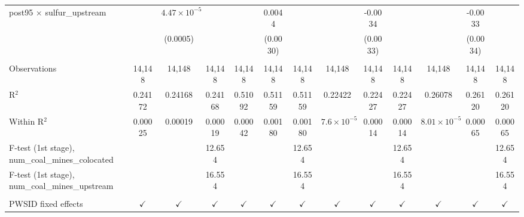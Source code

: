 \begin{table}[htbp]
\begin{adjustbox}{width = \textwidth, center}
\begin{tabular}{lcccccccccccc}
         post95 $\times$ sulfur\_upstream                   &                       & $4.47\times 10^{-5}$  &               &               & 0.0044          &               &                      & -0.0034       &               &                       & -0.0033       &   \\   
                                                            &                       & (0.0005)              &               &               & (0.0030)        &               &                      & (0.0033)      &               &                       & (0.0034)      &   \\   
          \\
         Observations                                       & 14,148                & 14,148                & 14,148        & 14,148        & 14,148          & 14,148        & 14,148               & 14,148        & 14,148        & 14,148                & 14,148        & 14,148\\  
         R$^2$                                              & 0.24172               & 0.24168               & 0.24168       & 0.51092       & 0.51159         & 0.51159       & 0.22422              & 0.22427       & 0.22427       & 0.26078               & 0.26120       & 0.26120\\  
         Within R$^2$                                       & 0.00025               & 0.00019               & 0.00019       & 0.00042       & 0.00180         & 0.00180       & $7.6\times 10^{-5}$  & 0.00014       & 0.00014       & $8.01\times 10^{-5}$  & 0.00065       & 0.00065\\  
         F-test (1st stage), num\_coal\_mines\_colocated    &                       &                       & 12.654        &               &                 & 12.654        &                      &               & 12.654        &                       &               & 12.654\\  
         F-test (1st stage), num\_coal\_mines\_upstream     &                       &                       & 16.554        &               &                 & 16.554        &                      &               & 16.554        &                       &               & 16.554\\  
          \\
         PWSID fixed effects                                & $\checkmark$          & $\checkmark$          & $\checkmark$  & $\checkmark$  & $\checkmark$    & $\checkmark$  & $\checkmark$         & $\checkmark$  & $\checkmark$  & $\checkmark$          & $\checkmark$  & $\checkmark$\\   

\end{tabular}
\end{adjustbox}
\end{table}
